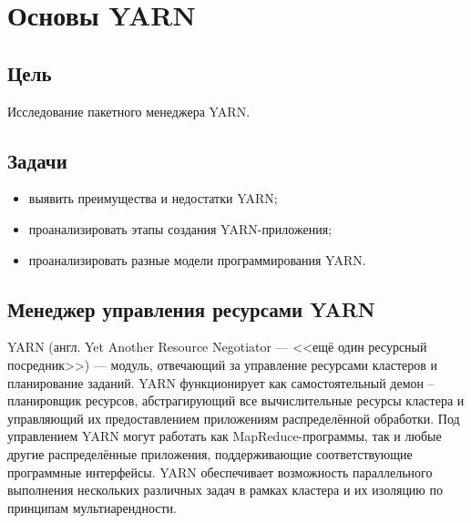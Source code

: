 



\usepackage{tabularx}
\usepackage{multicol}

\newcommand{\labnumber}{3} %



\graphicspath{{figures/}}


\Ukrainian


\addtocounter{page}{1}

\section{Основы YARN}
\subsection*{Цель}
Исследование пакетного менеджера YARN.
\subsection*{Задачи}
\begin{itemize}
    \item выявить преимущества и недостатки YARN;
    \item проанализировать этапы создания YARN-приложения;
    \item проанализировать разные модели программирования YARN.
\end{itemize}

\subsection{Менеджер управления ресурсами YARN}
YARN (англ.  Yet Another Resource Negotiator --- <<ещё один ресурсный посредник>>) --- модуль, отвечающий за управление ресурсами кластеров и планирование заданий. 
YARN функционирует как самостоятельный демон -- планировщик ресурсов, абстрагирующий все вычислительные ресурсы кластера и управляющий их предоставлением приложениям распределённой обработки. 
Под управлением YARN могут работать как MapReduce-программы, так и любые другие распределённые приложения, поддерживающие соответствующие программные интерфейсы. YARN обеспечивает возможность параллельного выполнения нескольких различных задач в рамках кластера и их изоляцию по принципам мультиарендности. 

